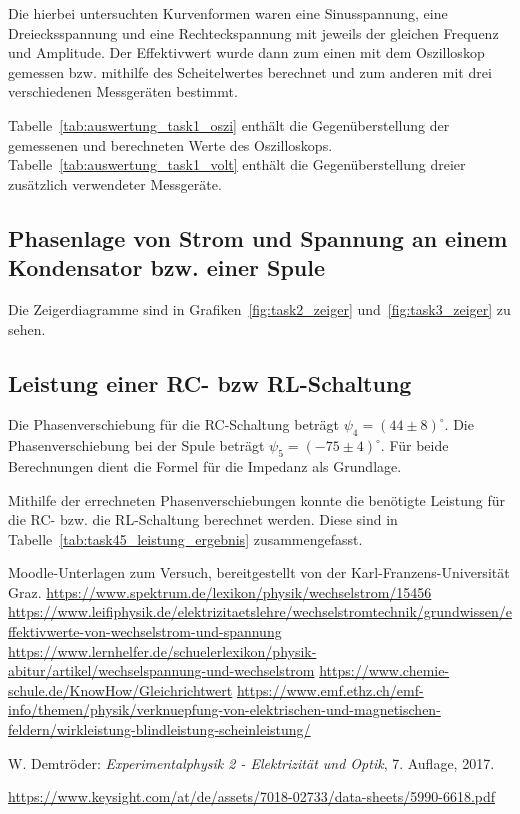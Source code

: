 \documentclass{article}
\begin{document}
Die hierbei untersuchten Kurvenformen waren eine Sinusspannung, eine Dreiecksspannung und eine Rechteckspannung mit jeweils der gleichen Frequenz und Amplitude. Der Effektivwert wurde dann zum einen mit dem Oszilloskop gemessen bzw. mithilfe des Scheitelwertes berechnet und zum anderen mit drei verschiedenen Messgeräten bestimmt.

Tabelle~\ref{tab:auswertung_task1_oszi} enthält die Gegenüberstellung der gemessenen und berechneten Werte des Oszilloskops. Tabelle~\ref{tab:auswertung_task1_volt} enthält die Gegenüberstellung dreier zusätzlich verwendeter Messgeräte. 




\subsection{Phasenlage von Strom und Spannung an einem Kondensator bzw. einer Spule}

Die Zeigerdiagramme sind in Grafiken~\ref{fig:task2_zeiger} und~\ref{fig:task3_zeiger} zu sehen.


\subsection{Leistung einer RC- bzw RL-Schaltung}
Die Phasenverschiebung für die RC-Schaltung beträgt $\psi_4 = (44\pm 8)^\circ$. Die Phasenverschiebung bei der Spule beträgt $\psi_5 = (-75 \pm 4)^\circ$.
Für beide Berechnungen dient die Formel für die Impedanz als Grundlage.

Mithilfe der errechneten Phasenverschiebungen konnte die benötigte Leistung für die RC- bzw. die RL-Schaltung berechnet werden. Diese sind in Tabelle~\ref{tab:task45_leistung_ergebnis} zusammengefasst.


\begin{thebibliography}{9}
 Moodle-Unterlagen zum Versuch, bereitgestellt von der Karl-Franzens-Universität Graz.
 \url{https://www.spektrum.de/lexikon/physik/wechselstrom/15456}
 \url{https://www.leifiphysik.de/elektrizitaetslehre/wechselstromtechnik/grundwissen/effektivwerte-von-wechselstrom-und-spannung}
 \url{https://www.lernhelfer.de/schuelerlexikon/physik-abitur/artikel/wechselspannung-und-wechselstrom}
 \url{https://www.chemie-schule.de/KnowHow/Gleichrichtwert}
 \url{https://www.emf.ethz.ch/emf-info/themen/physik/verknuepfung-von-elektrischen-und-magnetischen-feldern/wirkleistung-blindleistung-scheinleistung/}

 W. Demtröder: \emph{Experimentalphysik 2 - Elektrizität  und Optik}, 7. Auflage, 2017.

 \url{https://www.keysight.com/at/de/assets/7018-02733/data-sheets/5990-6618.pdf}
\end{thebibliography}
\end{document}
